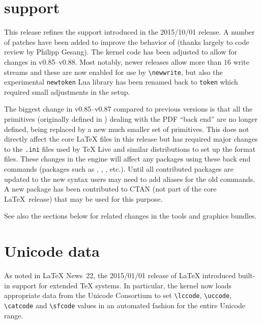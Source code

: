 \documentclass{ltnews}
\begin{document}
\maketitle

\tableofcontents

\section{ support}

This release refines the  support introduced in the
2015/10/01 release. A number of patches have been added to improve the
behavior of  (thanks largely to code review by Philipp Gesang).
The kernel code has been adjusted to
allow for changes in  v0.85--v0.88. Most notably, newer
 releases allow more than $16$ write streams and these are now
enabled for use by \verb|\newwrite|, but also the experimental
\texttt{newtoken} Lua library has been renamed back to \texttt{token}
which required small adjustments in the   setup.

The biggest change in   v0.85--v0.87 compared to previous
versions is that all the primitives (originally defined in
) dealing with the PDF ``back end''
are no longer defined, being replaced by a new much smaller set of primitives.
This does not directly affect the core \LaTeX{}
files in this release but has required major changes to the
\texttt{.ini} files used by \TeX{} Live and similar distributions to
set up the format files. These changes in the   engine
will affect any packages using these back end commands (packages such
as ,  ,  , etc.).
Until all contributed packages are updated to the new syntax users may
need to add aliases for the old  commands. A new
 package has been contributed to CTAN (not part of the
core \LaTeX\ release) that may be used for this purpose. 

See also the sections below for related changes in the
\textsf{tools} and \textsf{graphics} bundles.


\section{Unicode data}

As noted in \LaTeX{} News~22, the 2015/01/01 release of \LaTeX{} introduced
built-in support for extended \TeX{} systems. In particular, the kernel now
loads appropriate data from the Unicode Consortium to set \verb|\lccode|,
\verb|\uccode|, \verb|\catcode| and \verb|\sfcode| values in an automated
fashion for the entire Unicode range.
\end{document}
